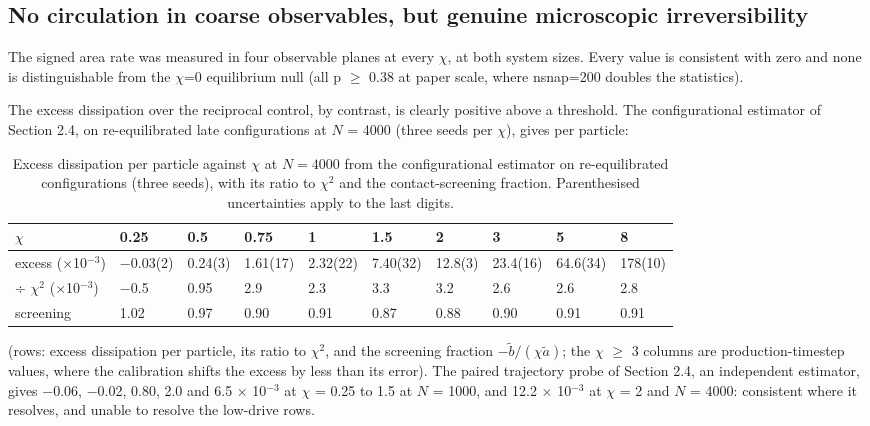 \documentclass[aps,pre,preprint,superscriptaddress,nofootinbib,longbibliography]{revtex4-2}
\begin{document}
\subsection{No circulation in coarse observables, but genuine microscopic irreversibility}

The signed area rate was measured in four observable planes at every $\chi$, at both system sizes. Every value is consistent with zero and none is distinguishable from the $\chi$=0 equilibrium null (all p $\ge$ 0.38 at paper scale, where nsnap=200 doubles the statistics).

The excess dissipation over the reciprocal control, by contrast, is clearly positive above a threshold. The configurational estimator of Section 2.4, on re-equilibrated late configurations at $N$ = 4000 (three seeds per $\chi$), gives per particle:

\begin{table}[htbp]
\caption{Excess dissipation per particle against $\chi$ at $N=4000$ from the configurational estimator on re-equilibrated configurations (three seeds), with its ratio to $\chi^2$ and the contact-screening fraction. Parenthesised uncertainties apply to the last digits.}
\label{tab:3}
\begin{ruledtabular}
\begin{tabular}{p{2.06cm}p{1.13cm}p{1.00cm}p{1.01cm}p{1.01cm}p{1.01cm}p{1.00cm}p{1.01cm}p{1.01cm}p{1.00cm}}
\raggedright
$\chi$ & 0.25 & 0.5 & 0.75 & 1 & 1.5 & 2 & 3 & 5 & 8 \\
\hline
excess ($\times$10$^{-3}$) & $-$0.03(2) & 0.24(3) & 1.61(17) & 2.32(22) & 7.40(32) & 12.8(3) & 23.4(16) & 64.6(34) & 178(10) \\
÷ $\chi ^{2}$ ($\times$10$^{-3}$) & $-$0.5 & 0.95 & 2.9 & 2.3 & 3.3 & 3.2 & 2.6 & 2.6 & 2.8 \\
screening & 1.02 & 0.97 & 0.90 & 0.91 & 0.87 & 0.88 & 0.90 & 0.91 & 0.91 \\
\end{tabular}
\end{ruledtabular}
\end{table}

(rows: excess dissipation per particle, its ratio to $\chi ^{2}$, and the screening fraction $-\tilde b/(\chi\tilde a)$; the $\chi$ $\ge$ 3 columns are production-timestep values, where the calibration shifts the excess by less than its error). The paired trajectory probe of Section 2.4, an independent estimator, gives $-$0.06, $-$0.02, 0.80, 2.0 and 6.5 $\times$ 10$^{-3}$ at $\chi$ = 0.25 to 1.5 at $N$ = 1000, and 12.2 $\times$ 10$^{-3}$ at $\chi$ = 2 and $N$ = 4000: consistent where it resolves, and unable to resolve the low-drive rows.
\end{document}
